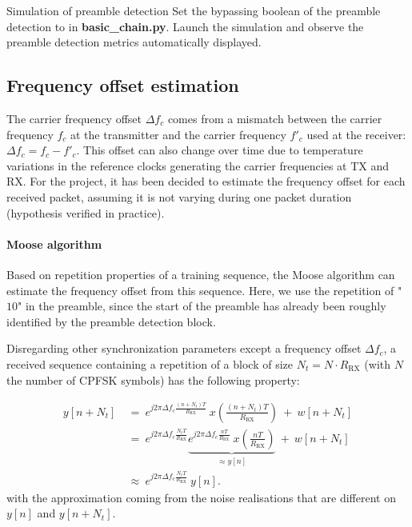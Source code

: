 \begin{bclogo}[couleur = gray!20, arrondi = 0.2, logo=\bccrayon]{Simulation of preamble detection}
Set the bypassing boolean of the preamble detection to  in \textbf{basic\_chain.py}. Launch the simulation and observe the preamble detection metrics automatically displayed.
\end{bclogo}

\subsection{Frequency offset estimation}
The carrier frequency offset $\Delta f_c$ comes from a mismatch between the carrier frequency $f_c$ at the transmitter and the carrier frequency $f'_c$ used at the receiver: $\Delta f_c=f_c-f'_c$. This offset can also change over time due to temperature variations in the reference clocks generating the carrier frequencies at TX and RX. For the project, it has been decided to estimate the frequency offset for each received packet, assuming it is not varying during one packet duration (hypothesis verified in practice).

\paragraph{Moose algorithm} Based on repetition properties of a training sequence, the Moose algorithm can estimate the frequency offset from this sequence. Here, we use the repetition of "$10$" in the preamble, since the start of the preamble has already been roughly identified by the preamble detection block.

Disregarding other synchronization parameters except a frequency offset $\Delta f_c$, a received sequence containing a repetition of a block of size $N_t=N\cdot R_{\text{RX}}$ (with $N$ the number of CPFSK symbols) has the following property:

\begin{align*}
    y[n+N_t] \:&=\:e^{j2\pi \Delta f_c \frac{(n+N_t)T}{R_{\text{RX}}}} \:x\left(\frac{(n+N_t)T}{R_{\text{RX}}}\right) \:+\: w[n+N_t]\\
    &=\:e^{j2\pi \Delta f_c \frac{N_tT}{R_{\text{RX}}}} \underbrace{e^{j2\pi \Delta f_c \frac{nT}{R_{\text{RX}}}}\:x\left(\frac{nT}{R_{\text{RX}}}\right)}_{\approx y[n]} \:+\: w[n+N_t]\\
    &\approx \:e^{j2\pi \Delta f_c \frac{N_tT}{R_{\text{RX}}}}\: y[n].
\end{align*}
with the approximation coming from the noise realisations that are different on $y[n]$ and $y[n+N_t]$.

